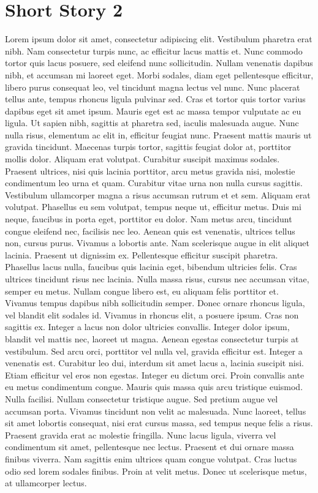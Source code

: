 \documentclass[a4paper]{memoir}
\begin{document}
\section{Short Story 2}
\label{shortstory2}

Lorem ipsum dolor sit amet, consectetur adipiscing elit. Vestibulum pharetra erat nibh. Nam consectetur turpis nunc, ac efficitur lacus mattis et. Nunc commodo tortor quis lacus posuere, sed eleifend nunc sollicitudin. Nullam venenatis dapibus nibh, et accumsan mi laoreet eget. Morbi sodales, diam eget pellentesque efficitur, libero purus consequat leo, vel tincidunt magna lectus vel nunc. Nunc placerat tellus ante, tempus rhoncus ligula pulvinar sed. Cras et tortor quis tortor varius dapibus eget sit amet ipsum. Mauris eget est ac massa tempor vulputate ac eu ligula.
Ut sapien nibh, sagittis at pharetra sed, iaculis malesuada augue. Nunc nulla risus, elementum ac elit in, efficitur feugiat nunc. Praesent mattis mauris ut gravida tincidunt. Maecenas turpis tortor, sagittis feugiat dolor at, porttitor mollis dolor. Aliquam erat volutpat. Curabitur suscipit maximus sodales. Praesent ultrices, nisi quis lacinia porttitor, arcu metus gravida nisi, molestie condimentum leo urna et quam.
Curabitur vitae urna non nulla cursus sagittis. Vestibulum ullamcorper magna a risus accumsan rutrum et et sem. Aliquam erat volutpat. Phasellus eu sem volutpat, tempus neque ut, efficitur metus. Duis mi neque, faucibus in porta eget, porttitor eu dolor. Nam metus arcu, tincidunt congue eleifend nec, facilisis nec leo. Aenean quis est venenatis, ultrices tellus non, cursus purus. Vivamus a lobortis ante. Nam scelerisque augue in elit aliquet lacinia. Praesent ut dignissim ex. Pellentesque efficitur suscipit pharetra. Phasellus lacus nulla, faucibus quis lacinia eget, bibendum ultricies felis. Cras ultrices tincidunt risus nec lacinia. Nulla massa risus, cursus nec accumsan vitae, semper eu metus. Nullam congue libero est, eu aliquam felis porttitor et. Vivamus tempus dapibus nibh sollicitudin semper.
Donec ornare rhoncus ligula, vel blandit elit sodales id. Vivamus in rhoncus elit, a posuere ipsum. Cras non sagittis ex. Integer a lacus non dolor ultricies convallis. Integer dolor ipsum, blandit vel mattis nec, laoreet ut magna. Aenean egestas consectetur turpis at vestibulum. Sed arcu orci, porttitor vel nulla vel, gravida efficitur est. Integer a venenatis est. Curabitur leo dui, interdum sit amet lacus a, lacinia suscipit nisi. Etiam efficitur vel eros non egestas. Integer eu dictum orci. Proin convallis ante eu metus condimentum congue. Mauris quis massa quis arcu tristique euismod. Nulla facilisi. Nullam consectetur tristique augue.
Sed pretium augue vel accumsan porta. Vivamus tincidunt non velit ac malesuada. Nunc laoreet, tellus sit amet lobortis consequat, nisi erat cursus massa, sed tempus neque felis a risus. Praesent gravida erat ac molestie fringilla. Nunc lacus ligula, viverra vel condimentum sit amet, pellentesque nec lectus. Praesent et dui ornare massa finibus viverra. Nam sagittis enim ultrices quam congue volutpat. Cras luctus odio sed lorem sodales finibus. Proin at velit metus. Donec ut scelerisque metus, at ullamcorper lectus. 
\end{document}
